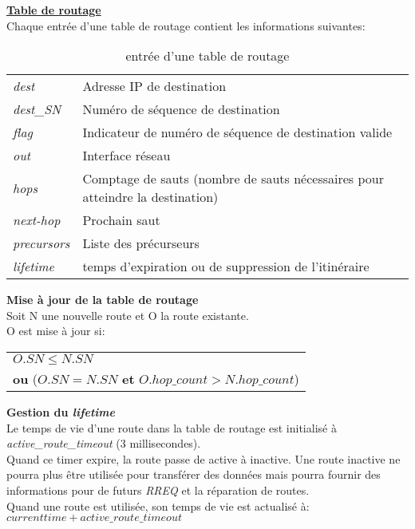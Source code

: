     \underline{\textbf{Table de routage}}\\
        Chaque entrée d'une table de routage contient les informations suivantes:
        
        \begin{table}[H]
            \centering
            \begin{tabular}{|l|l|}
                \hline
                \textit{dest}       & Adresse IP de destination\\
                \textit{dest\_SN}   & Numéro de séquence de destination\\
                \textit{flag}       & Indicateur de numéro de séquence de destination valide\\
                \textit{out}        & Interface réseau\\
                \textit{hops}       & Comptage de sauts (nombre de sauts nécessaires pour atteindre la destination)\\
                \textit{next-hop}   & Prochain saut\\
                \textit{precursors} & Liste des précurseurs\\
                \textit{lifetime}   & temps d'expiration ou de suppression de l'itinéraire\\
                \hline
            \end{tabular}
            \caption{entrée d'une table de routage \aodv \cite{aodv_w}}
            \label{routingTable_aodv}
        \end{table}

        \textbf{Mise à jour de la table de routage}\\
            Soit N une nouvelle route et O la route existante.\\
            O est mise à jour si:\\
            \begin{center}
                \begin{tabular}{|l|}
                    \hline
                    $O.SN \leq N.SN$ \\
                    \textbf{ou} ($O.SN = N.SN$ \textbf{et} $O.hop\_count > N.hop\_count$)\\
                    \hline
                \end{tabular}
            \end{center}
        
        \textbf{Gestion du \textit{lifetime}}\\
            Le temps de vie d'une route dans la table de routage est initialisé à \textit{active\_route\_timeout} (3 millisecondes).\\
            Quand ce timer expire, la route passe de active à inactive. Une route inactive ne pourra plus être utilisée pour transférer des données
            mais pourra fournir des informations pour de futurs \textit{RREQ} et la réparation de routes.\\
            Quand une route est utilisée, son temps de vie  est actualisé à: $current time + active\_route\_timeout$

